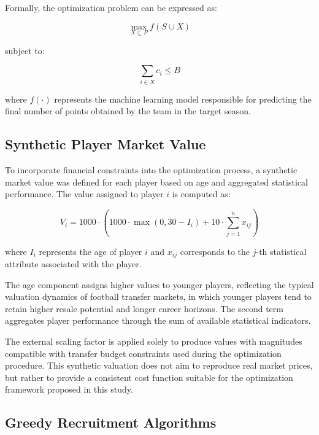 \documentclass[12pt]{article}
\begin{document}
Formally, the optimization problem can be expressed as:

\begin{equation}
\max_{X \subseteq P} f(S \cup X)
\end{equation}

subject to:

\begin{equation}
\sum_{i \in X} c_i \leq B
\end{equation}

where $f(\cdot)$ represents the machine learning model responsible for predicting the final number of points obtained by the team in the target season.

\subsection{Synthetic Player Market Value}

To incorporate financial constraints into the optimization process, a synthetic market value was defined for each player based on age and aggregated statistical
performance. The value assigned to player $i$ is computed as:

\begin{equation}
V_i = 1000 \cdot \left( 1000 \cdot \max(0, 30 - I_i) + 10 \cdot \sum_{j=1}^{n} x_{ij} \right)
\end{equation}

where $I_i$ represents the age of player $i$ and $x_{ij}$ corresponds to the $j$-th statistical attribute associated with the player.

The age component assigns higher values to younger players, reflecting the typical valuation dynamics of football transfer markets, in which younger
players tend to retain higher resale potential and longer career horizons. The second term aggregates player performance through the sum of available
statistical indicators.

The external scaling factor is applied solely to produce values with magnitudes compatible with transfer budget constraints used during the optimization
procedure. This synthetic valuation does not aim to reproduce real market prices, but rather to provide a consistent cost function suitable for the optimization
framework proposed in this study.

\subsection{Greedy Recruitment Algorithms}
\end{document}
